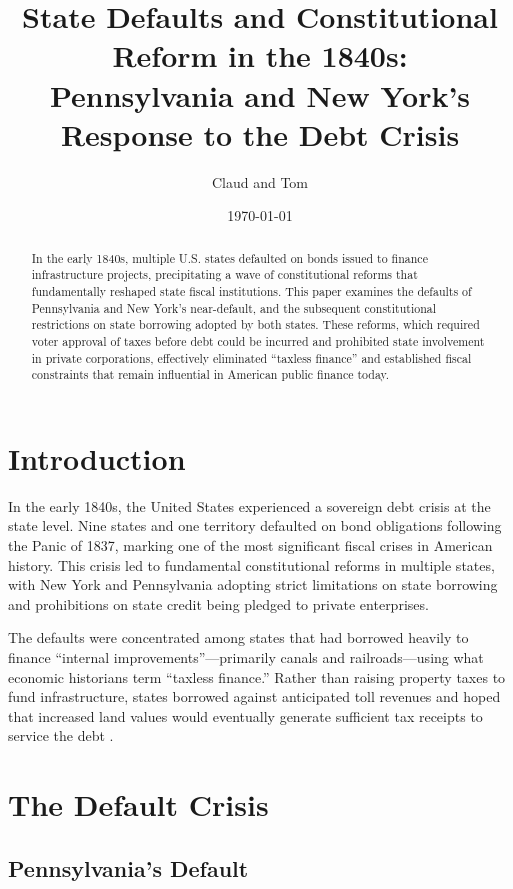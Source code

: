 \documentclass[12pt]{article}
\title{State Defaults and Constitutional Reform in the 1840s:\\
Pennsylvania and New York's Response to the Debt Crisis}
\author{Claud and Tom}
\date{\today}
\begin{document}
\maketitle

\begin{abstract}
In the early 1840s, multiple U.S. states defaulted on bonds issued to finance infrastructure projects, precipitating a wave of constitutional reforms that fundamentally reshaped state fiscal institutions. This paper examines the defaults of Pennsylvania and New York's near-default, and the subsequent constitutional restrictions on state borrowing adopted by both states. These reforms, which required voter approval of taxes before debt could be incurred and prohibited state involvement in private corporations, effectively eliminated ``taxless finance'' and established fiscal constraints that remain influential in American public finance today.
\end{abstract}

\section{Introduction}

In the early 1840s, the United States experienced a sovereign debt crisis at the state level. Nine states and one territory defaulted on bond obligations following the Panic of 1837, marking one of the most significant fiscal crises in American history. This crisis led to fundamental constitutional reforms in multiple states, with New York and Pennsylvania adopting strict limitations on state borrowing and prohibitions on state credit being pledged to private enterprises.

The defaults were concentrated among states that had borrowed heavily to finance ``internal improvements''---primarily canals and railroads---using what economic historians term ``taxless finance.'' Rather than raising property taxes to fund infrastructure, states borrowed against anticipated toll revenues and hoped that increased land values would eventually generate sufficient tax receipts to service the debt \citep{wallis2005constitutions}.

\section{The Default Crisis}

\subsection{Pennsylvania's Default}
\end{document}
